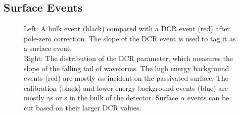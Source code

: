 \documentclass[/main.tex]{subfiles}
\begin{document}
\subsection{Surface Events} \label{sec:dcr}
\begin{figure}
  \centering
  \caption[Surface alpha cut]{\label{fig:dcr}
    Left: A bulk event (black) compared with a DCR event (red) after pole-zero correction. The slope of the DCR event is used to tag it as a surface event.\\
    Right: The distribution of the DCR parameter, which measures the slope of the falling tail of waveforms. The high energy background events (red) are mostly $\alpha$s incident on the passivated surface. The calibration (black) and lower energy background events (blue) are mostly $\gamma$s or \tnbb s in the bulk of the detector. Surface $\alpha$ events can be cut based on their larger DCR values.
  }
\end{figure}
\end{document}
